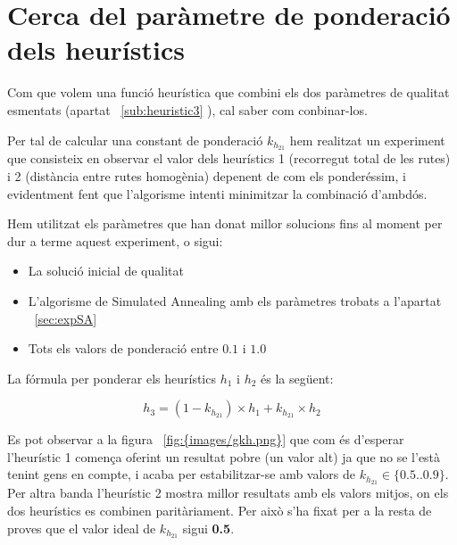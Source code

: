 \newpage
\section{Cerca del paràmetre de ponderació dels heurístics} %
\label{sec:expkh}

Com que volem una funció heurística que combini els dos paràmetres de qualitat esmentats (apartat ~\ref{sub:heuristic3}
), cal saber com conbinar-los. 

Per tal de calcular una constant de ponderació $k_{h_{21}}$ hem realitzat un experiment que consisteix en observar el valor dels heurístics 1 (recorregut total de les rutes) i 2 (distància entre rutes homogènia) depenent de com els ponderéssim, i evidentment fent que l'algorisme intenti minimitzar la combinació d'ambdós.

Hem utilitzat els paràmetres que han donat millor solucions fins al moment per dur a terme aquest experiment, o sigui:
\begin{itemize}
	\item La solució inicial de qualitat
	\item L'algorisme de Simulated Annealing amb els paràmetres trobats a l'apartat ~\ref{sec:expSA}
	\item Tots els valors de ponderació entre $0.1$ i $1.0$
\end{itemize}

La fórmula per ponderar els heurístics $h_1$ i $h_2$ és la següent:

\begin{center}
	\large
	\[
		h_3 = (1 - k_{h_{21}}) \times h_1 + k_{h_{21}} \times h_2
	\]
\end{center}


Es pot observar a la figura ~\ref{fig:{images/gkh.png}} que com és d'esperar l'heurístic 1 comença oferint un resultat pobre (un valor alt) ja que no se l'està tenint gens en compte, i acaba per estabilitzar-se amb valors de $k_{h_{21}} \in \{ 0.5 .. 0.9\}$. Per altra banda l'heurístic 2 mostra millor resultats amb els valors mitjos, on els dos heurístics es combinen paritàriament. Per això s'ha fixat per a la resta de proves que el valor ideal de $k_{h_{21}}$ sigui \textbf{0.5}.
